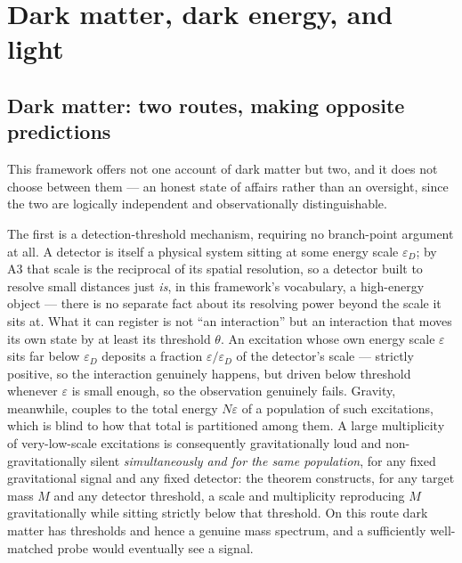 \documentclass[aps,prd,twocolumn,superscriptaddress,nofootinbib]{revtex4-2}
\begin{document}
\section{Dark matter, dark energy, and light}\label{sec:cosmology}

\subsection{Dark matter: two routes, making opposite predictions}

This framework offers not one account of dark matter but two, and it
does not choose between them — an honest state of affairs rather than an
oversight, since the two are logically independent and observationally
distinguishable.

The first is a detection-threshold mechanism, requiring no branch-point
argument at all. A detector is itself a physical system sitting at some
energy scale $\varepsilon_D$; by A3 that scale is the reciprocal of its
spatial resolution, so a detector built to resolve small distances just
\emph{is}, in this framework's vocabulary, a high-energy object — there
is no separate fact about its resolving power beyond the scale it sits
at. What it can register is not ``an interaction''
but an interaction that moves its own state by at least its threshold
$\theta$. An excitation whose own energy scale $\varepsilon$ sits far
below $\varepsilon_D$ deposits a fraction $\varepsilon/\varepsilon_D$ of
the detector's scale — strictly positive, so the interaction genuinely
happens, but driven below threshold whenever $\varepsilon$ is small
enough, so the observation genuinely fails. Gravity, meanwhile, couples
to the total energy $N\varepsilon$ of a population of such excitations,
which is blind to how that total is partitioned among them. A large
multiplicity of very-low-scale excitations is consequently
gravitationally loud and non-gravitationally silent \emph{simultaneously
and for the same population}, for any fixed gravitational signal and any
fixed detector: the theorem constructs, for any target mass $M$ and any
detector threshold, a scale and multiplicity reproducing $M$
gravitationally while sitting strictly below that threshold. On this
route dark matter has thresholds and hence a genuine mass spectrum, and
a sufficiently well-matched probe would eventually see a signal.
\end{document}

